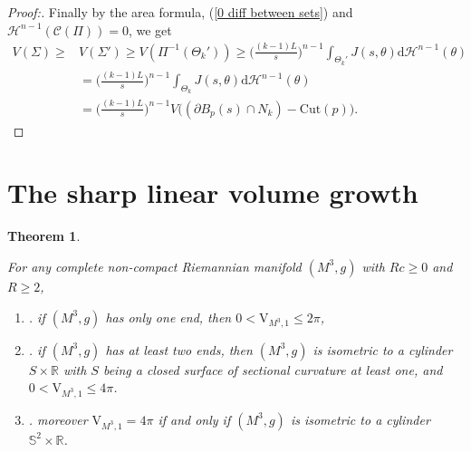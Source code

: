 \documentclass[11pt]{amsart}
\newtheorem{theorem}{Theorem}[section]
\numberwithin{equation}{section}
\renewcommand{\d}{\mathrm{d}}
\begin{document}
\begin{proof}[Proof:]
Finally by the area formula, (\ref{0 diff between sets}) and $\mathcal{H}^{n- 1}(\mathcal{C}(\Pi))= 0$, we get
\begin{align*}
    V(\Sigma)\geq & V(\Sigma')\geq V(\Pi^{-1}(\Theta_{k}'))
    \geq \bigg(\frac{(k- 1)L}{s}\bigg)^{n- 1}\int_{\Theta_{k}'} J(s,\theta)\d \mathcal{H}^{{n- 1}}(\theta)\\
    &=\bigg(\frac{(k- 1)L}{s}\bigg)^{n- 1}\int_{\Theta_{k}} J(s,\theta)\d \mathcal{H}^{{n- 1}}(\theta)\\
&=\bigg(\frac{(k- 1)L}{s}\bigg)^{n- 1} V\Big((\partial B_p(s)\cap N_k)- \mathrm{Cut}(p)\Big).
\end{align*}
\end{proof}

\section{The sharp linear volume growth}\label{sec main proof}

\begin{theorem}\label{thm sharp volume growth} 
{For any complete non-compact Riemannian manifold $(M^3, g)$ with $Rc\geq 0$ and $R\geq 2$, 
\begin{enumerate}
\item[(1)].  if $(M^3, g)$ has only one end,  then $\displaystyle 0< \mathrm{V}_{M^3, 1}\leq 2\pi$,
\item[(2)]. if $(M^3,g)$ has at least two ends, then $(M^3,g)$ is isometric to a cylinder $S\times\mathbb{R}$ with $S$ being a closed surface of sectional curvature at least one, and $\displaystyle 0< \mathrm{V}_{M^3, 1}\leq 4\pi$. 
\item[(3)].  moreover $\mathrm{V}_{M^3, 1}= 4\pi$ if and only if $(M^3,g)$ is isometric to a cylinder $\mathbb{S}^2\times\mathbb{R}$. 
\end{enumerate}
}
\end{theorem}
\end{document}
